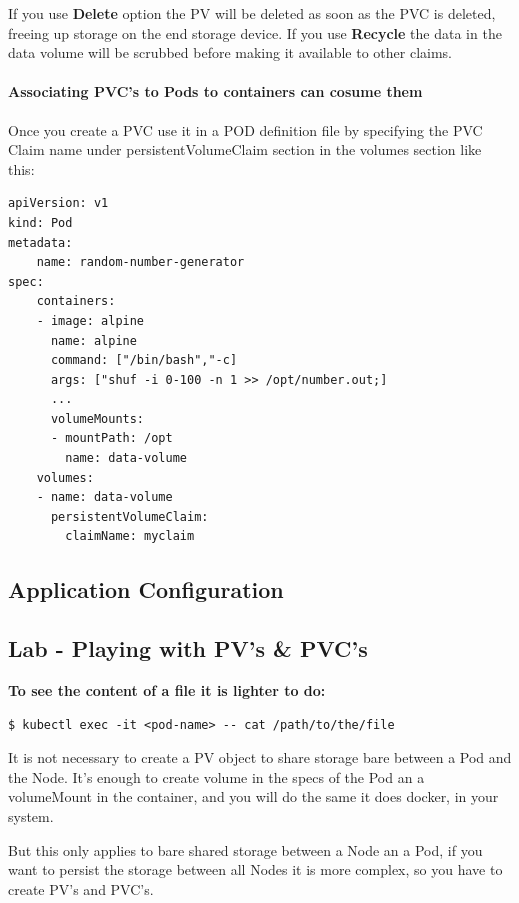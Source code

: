 \documentclass{article}
\newenvironment{blocktemplateIII}[1]{%
    \tcolorbox[beamer,%
    noparskip,breakable,
    ,colframe=Red,%
    colbacklower=LimeGreen!75!LightGreen,%
    title=#1]}%
    {\endtcolorbox}
\newenvironment{codetemplate}[1][]{%
  \mybasecolorbox[#1]
  \itshape
}{%
  \endmybasecolorbox
}
\begin{document}
If you use \textbf{Delete} option the PV will be deleted as soon as the PVC is deleted, freeing up storage on the end storage device. If you use \textbf{Recycle} the data in the data volume will be scrubbed before making it available to other claims.

\paragraph{Associating PVC's to Pods to containers can cosume them}

Once you create a PVC use it in a POD definition file by specifying the PVC Claim name under persistentVolumeClaim section in the volumes section like this:

\begin{codetemplate}{}
\begin{verbatim}
apiVersion: v1
kind: Pod
metadata:
    name: random-number-generator
spec:
    containers:
    - image: alpine
      name: alpine
      command: ["/bin/bash","-c]
      args: ["shuf -i 0-100 -n 1 >> /opt/number.out;]
      ...
      volumeMounts:
      - mountPath: /opt
        name: data-volume
    volumes:
    - name: data-volume
      persistentVolumeClaim:
        claimName: myclaim
\end{verbatim}
\end{codetemplate}

\subsection{Application Configuration}

\subsection{Lab - Playing with PV's \& PVC's}

\textbf{To see the content of a file it is lighter to do:}

\begin{codetemplate}{}
\begin{verbatim}
$ kubectl exec -it <pod-name> -- cat /path/to/the/file
\end{verbatim}
\end{codetemplate}

\begin{blocktemplateIII}{WARNING}
It is not necessary to create a PV object to share storage bare between a Pod and the Node. It's enough to create volume in the specs of the Pod an a volumeMount in the container, and you will do the same it does docker, in your system. 

But this only applies to bare shared storage between a Node an a Pod, if you want to persist the storage between all Nodes it is more complex, so you have to create PV's and PVC's.
\end{blocktemplateIII}
\end{document}
